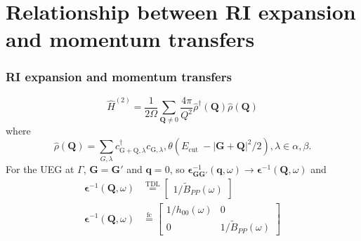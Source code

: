 \section{Relationship between RI expansion and momentum transfers}
\begin{frame}
\frametitle{RI expansion and momentum transfers}
\begin{equation}
\hat{H}^{(2)}=\frac{1}{2 \Omega} \sum_{\mathbf{Q} \neq 0} \frac{4 \pi}{Q^2} \hat{\rho}^{\dagger}(\mathbf{Q}) \hat{\rho}(\mathbf{Q})
\label{eq:two_body_hamiltonian}
\end{equation}
where 
\begin{equation}
\hat{\rho}(\mathbf{Q}) = \sum_{G , \lambda} c_{\mathrm{G}+\mathrm{Q}, \lambda}^{\dagger} c_{\mathrm{G}, \lambda}, \theta\left({E_{\text {cut }}-|\mathbf{G}+\mathbf{Q}|^2 / 2}\right), \lambda \in \alpha ,\beta .
\end{equation}
\pause
For the UEG at $\Gamma $, $\bm{G}=\bm{G'}$ and $\bm{q}=0$, so $\bm{\epsilon}^{-1}_{\bm{G}\bm{G'}}(\bm{q},\omega)\rightarrow \bm{\epsilon}^{-1}(\bm{Q},\omega)$ 
\pause
and
\begin{align}
\bm{\epsilon}^{-1}(\bm{Q},\omega) &\overset{\text{TDL}}{=}\begin{bmatrix}
 1/{\tilde{B}}_{PP}(\omega) 
    \end{bmatrix}\\
   \bm{\epsilon}^{-1}(\bm{Q},\omega) &\overset{\text{fc}}{=}\begin{bmatrix}
      1/h_{00}(\omega)        & 0 \\
      0        & 1/{\tilde{B}}_{PP}(\omega) 
    \end{bmatrix}
\end{align}
\end{frame}

